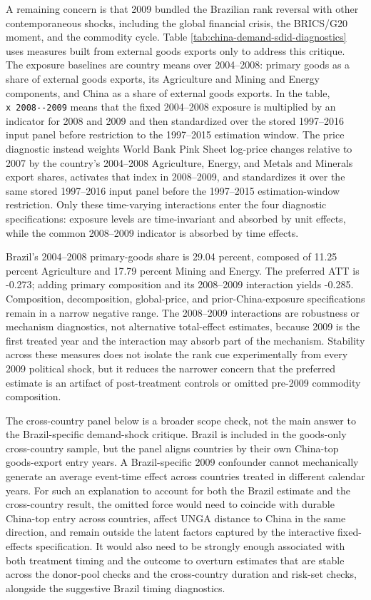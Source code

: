 \documentclass[referee,pdflatex,sn-basic]{sn-jnl}
\theoremstyle{thmstylethree}
\begin{document}
A remaining concern is that 2009 bundled the Brazilian rank reversal with other contemporaneous shocks, including the global financial crisis, the BRICS/G20 moment, and the commodity cycle. Table \ref{tab:china-demand-sdid-diagnostics} uses measures built from external goods exports only to address this critique. The exposure baselines are country means over 2004--2008: primary goods as a share of external goods exports, its Agriculture and Mining and Energy components, and China as a share of external goods exports. In the table, \texttt{x\ 2008-\/-2009} means that the fixed 2004--2008 exposure is multiplied by an indicator for 2008 and 2009 and then standardized over the stored 1997--2016 input panel before restriction to the 1997--2015 estimation window. The price diagnostic instead weights World Bank Pink Sheet log-price changes relative to 2007 by the country's 2004--2008 Agriculture, Energy, and Metals and Minerals export shares, activates that index in 2008--2009, and standardizes it over the same stored 1997--2016 input panel before the 1997--2015 estimation-window restriction. Only these time-varying interactions enter the four diagnostic specifications: exposure levels are time-invariant and absorbed by unit effects, while the common 2008--2009 indicator is absorbed by time effects.

Brazil's 2004--2008 primary-goods share is 29.04 percent, composed of 11.25 percent Agriculture and 17.79 percent Mining and Energy. The preferred ATT is -0.273; adding primary composition and its 2008--2009 interaction yields -0.285. Composition, decomposition, global-price, and prior-China-exposure specifications remain in a narrow negative range. The 2008--2009 interactions are robustness or mechanism diagnostics, not alternative total-effect estimates, because 2009 is the first treated year and the interaction may absorb part of the mechanism. Stability across these measures does not isolate the rank cue experimentally from every 2009 political shock, but it reduces the narrower concern that the preferred estimate is an artifact of post-treatment controls or omitted pre-2009 commodity composition.

The cross-country panel below is a broader scope check, not the main answer to the Brazil-specific demand-shock critique. Brazil is included in the goods-only cross-country sample, but the panel aligns countries by their own China-top goods-export entry years. A Brazil-specific 2009 confounder cannot mechanically generate an average event-time effect across countries treated in different calendar years. For such an explanation to account for both the Brazil estimate and the cross-country result, the omitted force would need to coincide with durable China-top entry across countries, affect UNGA distance to China in the same direction, and remain outside the latent factors captured by the interactive fixed-effects specification. It would also need to be strongly enough associated with both treatment timing and the outcome to overturn estimates that are stable across the donor-pool checks and the cross-country duration and risk-set checks, alongside the suggestive Brazil timing diagnostics.
\end{document}
